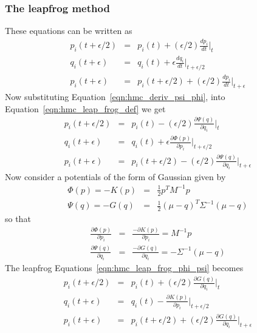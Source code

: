 \subsubsection{The leapfrog method}
These equations can be written as
\begin{eqnarray}
\label{eqn:hmc_leap_frog_def}
p_i (t+ \epsilon/2) &=& p_i(t) + (\epsilon/2) \frac{dp_i}{dt} \Big\vert_{t} \\
q_i (t+\epsilon) &=& q_i(t) + \epsilon \frac{dq_i}{dt} \Big\vert_{t+ \epsilon/2} \\
p_i (t+\epsilon) &=& p_i (t+ \epsilon/2) + (\epsilon/2) \frac{dp_i}{dt} \Big\vert_{t+\epsilon}
\end{eqnarray}
Now substituting Equation~\ref{eqn:hmc_deriv_psi_phi}, into Equation~\ref{eqn:hmc_leap_frog_def} we get
\begin{eqnarray}
\label{eqn:hmc_leap_frog_phi_psi}
p_i (t+ \epsilon/2) &=& p_i(t) - (\epsilon/2) \frac{\partial \Psi(q)}{\partial q_i} \Big\vert_{t} \\
q_i (t+\epsilon) &=& q_i(t) + \epsilon\frac{\partial \Phi(p)}{\partial p_i} \Big\vert_{t+ \epsilon/2} \\
p_i (t+\epsilon) &=& p_i (t+ \epsilon/2) - 
	(\epsilon/2) \frac{\partial \Psi(q)}{\partial q_i} \Big\vert_{t+\epsilon}
\end{eqnarray}
Now consider a potentials of the form of Gaussian given by
\begin{eqnarray}
\Phi(p) = -K(p) &=& \frac{1}{2} p^T M^{-1} p \\
\Psi(q) = -G(q) &=& \frac{1}{2} (\mu - q)^T\Sigma^{-1}(\mu - q)
\end{eqnarray}
so that
\begin{eqnarray}
\label{eqn:hmc_def_K_G}
\frac{\partial \Phi(p)}{\partial p_i} &=& \frac{-\partial K(p)}{\partial p_i} = M^{-1}p\\
\frac{\partial \Psi(q)}{\partial q_i} &=& \frac{-\partial G(q)}{\partial q_i} = -\Sigma^{-1}(\mu - q)
\end{eqnarray}
The leapfrog Equations~\ref{eqn:hmc_leap_frog_phi_psi} becomes
\begin{eqnarray}
p_i (t+ \epsilon/2) &=& p_i(t) + (\epsilon/2) \frac{\partial G(q)}{\partial q_i} \Big\vert_{t} \\
q_i (t+\epsilon) &=& q_i(t) - \frac{\partial K(p)}{\partial p_i} \Big\vert_{t+ \epsilon/2} \\
p_i (t+\epsilon) &=& p_i (t+ \epsilon/2) + 
	(\epsilon/2) \frac{\partial G(q)}{\partial q_i} \Big\vert_{t+\epsilon}
\end{eqnarray}
